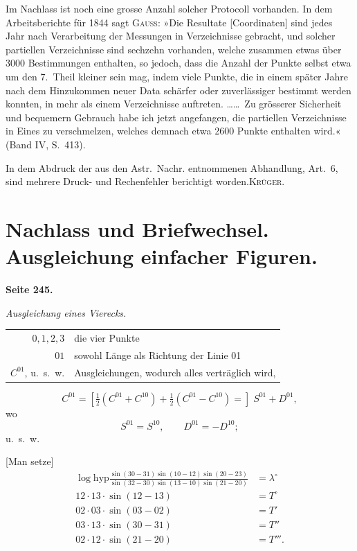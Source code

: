 \documentclass[12pt,a4paper]{article}
\theoremstyle{plain}
\theoremstyle{definition}
\theoremstyle{remark}
\begin{document}
Im Nachlass ist noch eine grosse Anzahl solcher Protocoll vorhanden. In dem Arbeitsberichte für 1844 sagt \textsc{Gauß}: »Die Resultate [Coordinaten] sind jedes Jahr nach Verarbeitung der Messungen in Verzeichnisse gebracht, und solcher partiellen Verzeichnisse sind sechzehn vorhanden, welche zusammen etwas über 3000 Bestimmungen enthalten, so jedoch, dass die Anzahl der Punkte selbst etwa um den 7.~Theil kleiner sein mag, indem viele Punkte, die in einem später Jahre nach dem Hinzukommen neuer Data schärfer oder zuverlässiger bestimmt werden konnten, in mehr als einem Verzeichnisse auftreten. \ldots\ldots\ Zu grösserer Sicherheit und bequemern Gebrauch habe ich jetzt angefangen, die partiellen Verzeichnisse in Eines zu verschmelzen, welches demnach etwa 2600 Punkte enthalten wird.« (Band IV, S.~413).

In dem Abdruck der aus den Astr.~Nachr. entnommenen Abhandlung, Art.~6, sind mehrere Druck- und Rechenfehler berichtigt worden.\hfill\textsc{Krüger.}

\newpage
\section*{Nachlass und Briefwechsel. Ausgleichung einfacher Figuren.}


\textbf{Seite 245.}\quad [1.]

\begin{center}
\emph{Ausgleichung eines Vierecks.}
\end{center}

\begin{tabular}{r@{\ldots\ldots\ }l}
$0, 1, 2, 3$ & die vier Punkte \\
$01$ & sowohl Länge als Richtung der Linie 01 \\
$C^{01}$, u.~s.~w. & Ausgleichungen, wodurch alles verträglich wird,
\end{tabular}
\[
C^{01} = [\tfrac{1}{2}(C^{01} + C^{10}) + \tfrac{1}{2}(C^{01} - C^{10}) =]\; S^{01} + D^{01},
\]
wo
\[
S^{01} = S^{10}, \qquad D^{01} = -D^{10};
\]
u.~s.~w.

[Man setze]
\begin{align*}
\log \mathrm{hyp} \frac{\sin(30 - 31) \sin(10 - 12) \sin(20 - 23)}{\sin(32 - 30) \sin(13 - 10) \sin(21 - 20)} &= \lambda^{\circ} \\
12 \cdot 13 \cdot \sin(12 - 13) &= T^{\circ} \\
02 \cdot 03 \cdot \sin(03 - 02) &= T' \\
03 \cdot 13 \cdot \sin(30 - 31) &= T'' \\
02 \cdot 12 \cdot \sin(21 - 20) &= T'''.
\end{align*}
\end{document}
